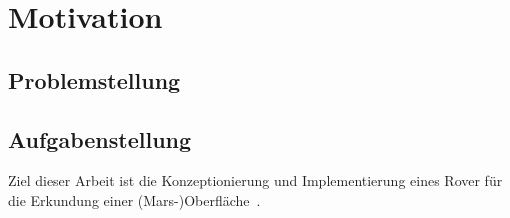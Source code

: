 \chapter{Motivation}
\label{chp:einleitung}



\section{Problemstellung}
\label{sec:problem}



\section{Aufgabenstellung}
\label{sec:aufgabe}

Ziel dieser Arbeit ist die \glqq Konzeptionierung und Implementierung eines Rover für die Erkundung einer (Mars-)Oberfläche\grqq\ \cite{mueller2019}.